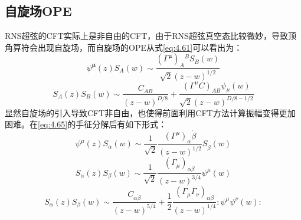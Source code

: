 \subsection{自旋场OPE}
RNS超弦的CFT实际上是非自由的CFT，由于RNS超弦真空态比较微妙，导致顶角算符会出现自旋场，而自旋场的OPE从式\ref{eq:4.61}可以看出为：
\begin{equation}
	\psi^{\boldsymbol{\mu}}(z)S_A(w)\sim\frac{(\Gamma^{\boldsymbol{\mu}})_A{}^BS_B(w)}{\sqrt{2}(z-w)^{1/2}}
\end{equation}
\begin{equation}
	S_A(z)S_B(w)\sim\frac{C_{AB}}{(z-w)^{D/8}}+\frac{(\Gamma^\mu C)_{AB}\psi_\mu(w)}{\sqrt{2}(z-w)^{D/8-1/2}}
\end{equation}
显然自旋场的引入导致CFT非自由，也使得前面利用CFT方法计算振幅变得更加困难。在\ref{eq:4.65}的手征分解后有如下形式：
\begin{equation}
	\psi^\mu(z)S_\alpha(w)\sim\frac{1}{\sqrt{2}}\frac{(\Gamma^\mu)_\alpha\dot{\beta}}{(z-w)^{1/2}}S_{\dot{\beta}}(w)
\end{equation}
\begin{equation}
	S_\alpha(z)S_\beta(w)\sim\frac{1}{\sqrt2}\frac{(\Gamma_\mu)_{\alpha\beta}}{(z-w)^{3/4}}\psi^\mu(w)
\end{equation}
\begin{equation}
	S_\alpha(z)S_\beta(w)\sim\frac{C_{\alpha\dot{\beta}}}{(z-w)^{5/4}}+\frac{1}{2}\frac{(\Gamma_\mu\Gamma_\nu)_{\alpha\dot{\beta}}}{(z-w)^{1/4}}:\psi^\mu\psi^\nu(w):
\end{equation}
